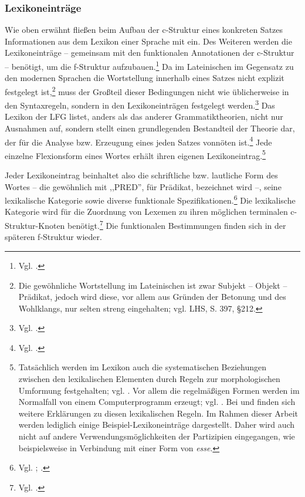 \documentclass[12pt,a4paper]{article}
\begin{document}
\subsubsection{Lexikoneinträge}
Wie oben erwähnt fließen beim Aufbau der c-Struktur eines konkreten Satzes Informationen aus dem Lexikon einer Sprache mit ein. Des Weiteren werden die Lexikoneinträge -- gemeinsam mit den funktionalen Annotationen der c-Struktur  -- benötigt, um die f-Struktur aufzubauen.\footnote{Vgl. \cite[63]{Skript}.} Da im Lateinischen im Gegensatz zu den modernen Sprachen die Wortstellung innerhalb eines Satzes nicht explizit festgelegt ist,\footnote{Die gewöhnliche Wortstellung im Lateinischen ist zwar Subjekt – Objekt – Prädikat, jedoch wird diese, vor allem aus Gründen der Betonung und des Wohlklangs, nur selten streng eingehalten; vgl. LHS, S. 397, §212.} muss der Großteil dieser Bedingungen nicht wie üblicherweise in den Syntaxregeln, sondern in den Lexikoneinträgen festgelegt werden.\footnote{Vgl. \cite[6]{Bresnan}.} Das Lexikon der LFG listet, anders als das anderer Grammatiktheorien, nicht nur Ausnahmen auf, sondern stellt einen grundlegenden Bestandteil der Theorie dar, der für die Analyse bzw. Erzeugung eines jeden Satzes vonnöten ist.\footnote{Vgl. \cite[3]{Dal}.} Jede einzelne Flexionsform eines Wortes erhält ihren eigenen Lexikoneintrag.\footnote{Tatsächlich werden im Lexikon auch die systematischen Beziehungen zwischen den lexikalischen Elementen durch Regeln zur morphologischen Umformung festgehalten; vgl. \cite[3]{Dal}. Vor allem die regelmäßigen Formen werden im Normalfall von einem Computerprogramm erzeugt; vgl. \cite[15]{Rohrer}. Bei \cite[63-76]{Skript} und \cite[20-21]{Rohrer} finden sich weitere Erklärungen zu diesen lexikalischen Regeln. Im Rahmen dieser Arbeit werden lediglich einige Beispiel-Lexikoneinträge dargestellt. Daher wird auch nicht auf andere Verwendungsmöglichkeiten der Partizipien eingegangen, wie beispielsweise in Verbindung mit einer Form von \textit{esse}.}


Jeder Lexikoneintrag beinhaltet also die schriftliche bzw. lautliche Form des Wortes -- die gewöhnlich mit ,,PRED'', für Prädikat, bezeichnet wird --, seine lexikalische Kategorie sowie diverse funktionale Spezifikationen.\footnote{Vgl. \cite[27; 33]{Rohrer}; \cite[16]{Skript}.} Die lexikalische Kategorie wird für die Zuordnung von Lexemen zu ihren möglichen terminalen c-Struktur-Knoten benötigt.\footnote{Vgl. \cite[63]{Skript}.} Die funktionalen Bestimmungen finden sich in der späteren f-Struktur wieder.
\end{document}
